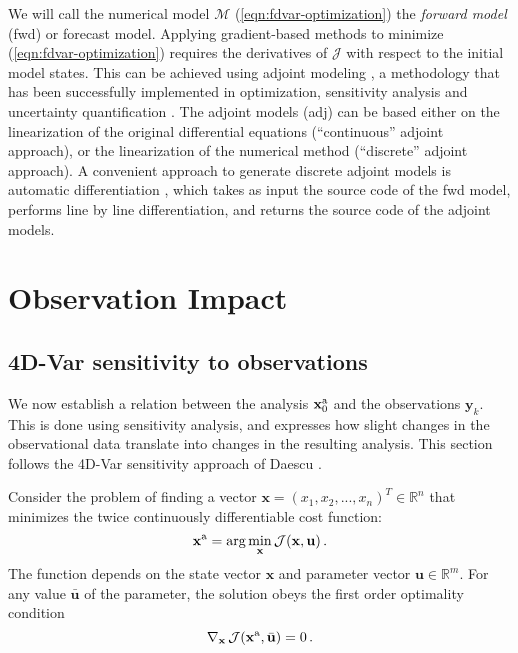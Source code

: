 \documentclass[final,sort&compress]{elsarticle}
\newcommand{\Jfunc}{\mathcal J }
\newcommand{\x}{   \mathbf{x} }
\newcommand{\xa}{ \mathbf{x}^{\rm a} }
\newcommand{\y}{ \mathbf{y} }
\renewcommand{\u}{ \mathbf{u} }
\begin{document}
We will call the numerical model $\mathcal{M}$ (\ref{eqn:fdvar-optimization}) the {\em forward model} ({\sc fwd}) or forecast model.
Applying gradient-based methods to minimize (\ref{eqn:fdvar-optimization}) requires the derivatives of $\Jfunc$ with respect to the initial model states.
This can be achieved using adjoint modeling \cite{cacuci1981sensitivity,wang1992second},
a methodology that has been successfully implemented in optimization, sensitivity analysis and uncertainty quantification
\cite{sandu2008discrete,SanduADJ_2005,Cioaca_2011}.
The adjoint models ({\sc adj}) can be based either on the linearization of the original differential equations (``continuous'' adjoint approach),
or the linearization of the numerical method (``discrete'' adjoint approach).
A convenient approach to generate discrete adjoint models is automatic differentiation  \cite{griewank1989automatic},
which takes as input the source code of the {\sc fwd} model, performs line by line differentiation, and returns the source code of the adjoint models.

\section{Observation Impact}\label{sec:oim}


\subsection{4D-Var sensitivity to observations}\label{sec:sensan}


We now establish a  relation between the analysis $\xa_0$ and the observations $\y_k$.
This is done using sensitivity analysis, and expresses how slight changes
in the observational data translate into changes in the resulting analysis.
This section follows the 4D-Var sensitivity approach of Daescu \cite{Daescu_2008}.

Consider the problem of finding a vector $\x = (x_1, x_2, ..., x_n)^T \in \mathbb{R}^n$ 
that minimizes the twice continuously differentiable cost function:
\begin{equation}
 \xa = \arg\min_{\x} \Jfunc(\x,\u) \,.
\end{equation}
The function depends on the state vector $\x$ and parameter vector $\u \in \mathbb{R}^m$. 
For any value $\bar{\u}$ of the parameter, the solution
obeys the first order optimality condition
\begin{equation}
 \nabla_\x \, \Jfunc(\xa,\bar{\u}) = 0 \,.
\label{eqn:fooc}
\end{equation}
\end{document}
